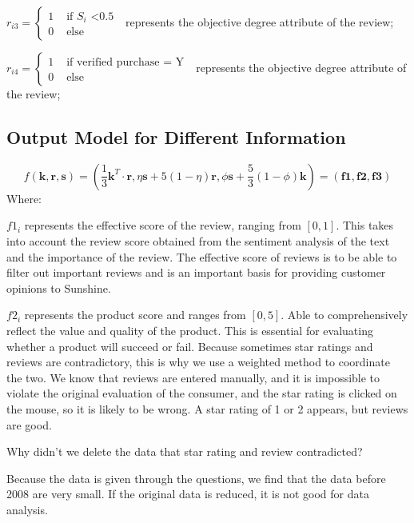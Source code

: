 \documentclass[UTF8]{article}
\begin{document}
$
r_{i3}=\left\{\begin{array}{ll}
1 & \text { if $S_i$ <0.5  } \\
0 & \text { else }
\end{array}\right.
$
represents the objective degree attribute of the review;

$
r_{i4}=\left\{\begin{array}{ll}
1 & \text { if verified purchase = Y } \\
0 & \text { else }
\end{array}\right.
$
represents the objective degree attribute of the review;

\subsection{Output Model for Different Information}

\begin{equation}\label{q1}
f(\boldsymbol{k},\boldsymbol{r},\boldsymbol{s})=(\frac{1}{3}\boldsymbol{k}^T\cdot \boldsymbol{r},\eta \boldsymbol{s} + 5(1-\eta)\boldsymbol{r},\phi\boldsymbol{s} + \frac{5}{3}(1-\phi)\boldsymbol{k})=(\boldsymbol{f1},\boldsymbol{f2},\boldsymbol{f3})
\end{equation}\label{zy1}
Where:

$f1_i$ represents the effective score of the review, ranging from $[0,1]$. This takes into account the review score obtained from the sentiment analysis of the text and the importance of the review. The effective score of reviews is to be able to filter out important reviews and is an important basis for providing customer opinions to Sunshine.

$f2_i$ represents the product score and ranges from $[0,5]$. Able to comprehensively reflect the value and quality of the product. This is essential for evaluating whether a product will succeed or fail. Because sometimes star ratings and reviews are contradictory, this is why we use a weighted method to coordinate the two. We know that reviews are entered manually, and it is impossible to violate the original evaluation of the consumer, and the star rating is clicked on the mouse, so it is likely to be wrong. A star rating of 1 or 2 appears, but reviews are good.

Why didn't we delete the data that star rating and review contradicted?

Because the data is given through the questions, we find that the data before 2008 are very small. If the original data is reduced, it is not good for data analysis.
\end{document}
